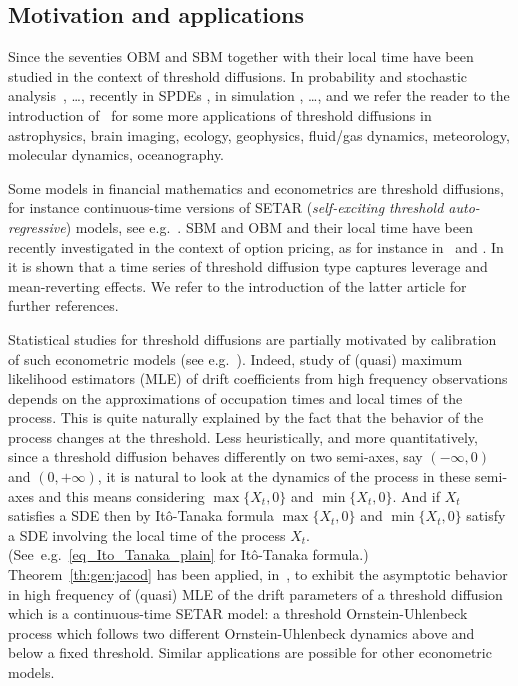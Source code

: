 \documentclass[12pt]{article}
\numberwithin{equation}{section}
\theoremstyle{definition}
\theoremstyle{remark}
\begin{document}
\subsection{Motivation and applications}


Since the seventies OBM and SBM together with their local time 
have been studied in the context 
of threshold diffusions.
%
In probability and stochastic analysis~\cite{barlow88skew, legall86yor, ramirezthesis, hajri15, forien19, taranto2021bi}, \ldots, recently in SPDEs \cite{BZ14, athreya2020well}, in simulation 
 \cite{EMloc, roberts2022skew}, \ldots, %
and we refer the reader to the introduction of~\cite{lejayPichot16} for some more applications of threshold diffusions in astrophysics, brain imaging, ecology, geophysics, fluid/gas dynamics, meteorology, molecular dynamics, oceanography. 

Some models in financial mathematics and econometrics are threshold diffusions, for instance continuous-time versions of SETAR ({\em self-exciting threshold auto-regressive}) models, see e.g.~\cite{decamps06, liptonsepp}. SBM and OBM and their local time have been recently investigated in the context of option pricing, as for instance in~\cite{GS17} and \cite{Cui21}. 
%
In \cite{lplaverage} it is shown that a time series of threshold diffusion type captures leverage and mean-reverting effects. We refer to the introduction of the latter article for further 
references. 

Statistical studies for threshold diffusions are partially motivated by calibration of such econometric models (see e.g.~\cite{SuChan15, lp}).
Indeed, study of (quasi) maximum likelihood estimators (MLE) of drift coefficients from high frequency observations 
depends on the approximations of occupation times 
and local times of the process. 
This is quite naturally explained by the fact that the behavior of the process changes at the threshold. 
Less heuristically, and more quantitatively, since 
a threshold diffusion 
behaves differently on two semi-axes, say $(-\infty,0)$ and $(0,+\infty)$, it is natural to look at the dynamics of the process in these semi-axes and this means considering $\max\{X_t,0\}$ and $\min\{X_t,0\}$. 
And if $X_t$ satisfies a SDE then by It\^o-Tanaka formula $\max\{X_t,0\}$ and $\min\{X_t,0\}$ satisfy a SDE involving the local time of the process $X_t$. (See~e.g.~\eqref{eq_Ito_Tanaka_plain} for It\^o-Tanaka formula.)
%
Theorem~\ref{th:gen:jacod} has been applied, in~\cite{mazzonetto2020drift}, to exhibit the asymptotic behavior in high frequency of (quasi) MLE of the drift parameters of a threshold diffusion which is a continuous-time SETAR model: a threshold Ornstein-Uhlenbeck process which follows two different Ornstein-Uhlenbeck dynamics above and below a fixed threshold. Similar applications are possible for other econometric models. 
\end{document}
